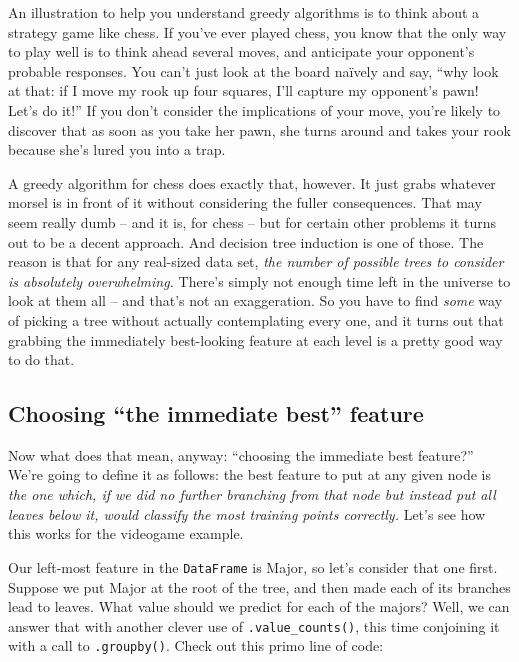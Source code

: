 
An illustration to help you understand greedy algorithms is to think about a
strategy game like chess. If you've ever played chess, you know that the only
way to play well is to think ahead several moves, and anticipate your
opponent's probable responses. You can't just look at the board na\"{i}vely and
say, ``why look at that: if I move my rook up four squares, I'll capture my
opponent's pawn! Let's do it!'' If you don't consider the implications of your
move, you're likely to discover that as soon as you take her pawn, she turns
around and takes your rook because she's lured you into a trap.

A greedy algorithm for chess does exactly that, however. It just grabs whatever
morsel is in front of it without considering the fuller consequences. That may
seem really dumb -- and it is, for chess -- but for certain other problems it
turns out to be a decent approach. And decision tree induction is one of those.
The reason is that for any real-sized data set, \textit{the number of possible
trees to consider is absolutely overwhelming.} There's simply not enough time
left in the universe to look at them all -- and that's not an exaggeration. So
you have to find \textit{some} way of picking a tree without actually
contemplating every one, and it turns out that grabbing the immediately
best-looking feature at each level is a pretty good way to do that.

\subsection{Choosing ``the immediate best'' feature}

Now what does that mean, anyway: ``choosing the immediate best feature?'' We're
going to define it as follows: the best feature to put at any given node is
\textit{the one which, if we did no further branching from that node but
instead put all leaves below it, would classify the most training points
correctly.} Let's see how this works for the videogame example.


Our left-most feature in the \texttt{DataFrame} is \textsf{Major}, so let's
consider that one first. Suppose we put \textsf{Major} at the root of the tree,
and then made each of its branches lead to leaves. What value should we predict
for each of the majors? Well, we can answer that with another clever use of
\texttt{.value\_counts()}, this time conjoining it with a call to
\texttt{.groupby()}. Check out this primo line of code:

